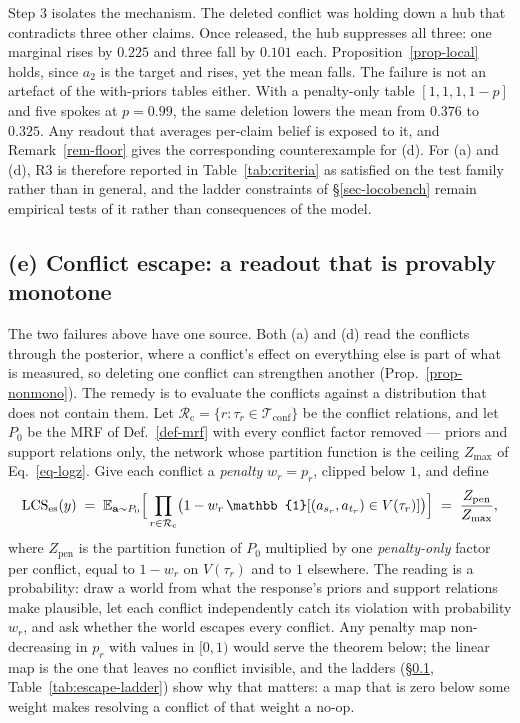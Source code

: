 Step 3 isolates the mechanism. The deleted conflict was holding down a hub that contradicts three
other claims. Once released, the hub suppresses all three: one marginal rises by $0.225$ and three
fall by $0.101$ each. Proposition~\ref{prop-local} holds, since $a_2$ is the target
and rises, yet the mean falls. The failure is not an artefact of the with-priors tables either. With
a penalty-only table $[1,1,1,1-p]$ and five spokes at $p=0.99$, the same deletion lowers the mean from
$0.376$ to $0.325$. Any readout that averages per-claim belief is exposed to it, and
Remark~\ref{rem-floor} gives the corresponding counterexample for (d). For (a) and (d), R3 is
therefore reported in Table~\ref{tab:criteria} as satisfied on the test family rather than in
general, and the ladder constraints of \S\ref{sec-locobench} remain empirical tests of it rather than
consequences of the model.

\subsection{(e) Conflict escape: a readout that is provably monotone}
\label{sec-escape}

The two failures above have one source. Both (a) and (d) read the conflicts through the posterior,
where a conflict's effect on everything else is part of what is measured, so deleting one conflict
can strengthen another (Prop.~\ref{prop-nonmono}). The remedy is to evaluate the conflicts against a
distribution that does not contain them. Let $\mathcal{R}_{\mathrm{c}}=\{r:\tau_r\in
\mathcal{T}_{\mathrm{conf}}\}$ be the conflict relations, and let $P_0$ be the MRF of
Def.~\ref{def-mrf} with every conflict factor removed --- priors and support relations only, the
network whose partition function is the ceiling $Z_{\max}$ of Eq.~\ref{eq-logz}. Give each conflict
a \emph{penalty} $w_r=p_r$, clipped below $1$, and define
\begin{equation}
\LCS_{\esc}(y)\;=\;\mathbb{E}_{\mathbf{a}\sim P_0}\Bigl[\,\prod_{r\in\mathcal{R}_{\mathrm{c}}}
  \bigl(1-w_r\,\mathbb{1}[(a_{s_r},a_{t_r})\in V(\tau_r)]\bigr)\Bigr]
\;=\;\frac{Z_{\mathrm{pen}}}{Z_{\max}} ,
\label{eq-escape}
\end{equation}
where $Z_{\mathrm{pen}}$ is the partition function of $P_0$ multiplied by one \emph{penalty-only}
factor per conflict, equal to $1-w_r$ on $V(\tau_r)$ and to $1$ elsewhere. The reading is a
probability: draw a world from what the response's priors and support relations make plausible, let
each conflict independently catch its violation with probability $w_r$, and ask whether the world
escapes every conflict. Any penalty map non-decreasing in $p_r$ with values in $[0,1)$ would serve
the theorem below; the linear map is the one that leaves no conflict invisible, and the ladders
(\S\ref{sec-escape}, Table~\ref{tab:escape-ladder}) show why that matters: a map that is zero below
some weight makes resolving a conflict of that weight a no-op.

